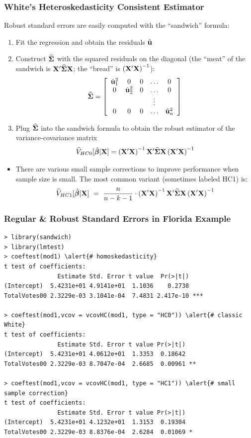 \documentclass[xcolor=svgnames,9pt,english,aspectratio=169,t]{beamer}
\begin{document}
\begin{frame}[fragile]
\frametitle{White's Heteroskedasticity Consistent Estimator}
\begin{small}
Robust standard errors are easily computed with the ``sandwich'' formula:

\begin{enumerate}
  \item Fit the regression and obtain the residuals $\hat{\mathbf{u}}$
  \item Construct $\widehat{\boldsymbol{\Sigma}}$ with the squared residuals on the diagonal (the ``meat'' of the sandwich is $\mathbf{X}'\widehat{\boldsymbol{\Sigma}}\mathbf{X}$; the ``bread'' is $\left(\mathbf{X}'\mathbf{X}\right)^{-1}$):
  $$\widehat{\boldsymbol{\Sigma}}=
 \left[ \begin{array}{ccccc} \hat{\mathbf{u}}_1^2 & 0 & 0 & \dots & 0 \\
0 & \hat{\mathbf{u}}_2^2 & 0 & \dots & 0 \\
 & & & \vdots & \\
 0 & 0 & 0 & \dots & \hat{\mathbf{u}}_n^2 \end{array} \right]
$$
\item Plug $\widehat{\boldsymbol{\Sigma}}$ into the sandwich formula to obtain the robust estimator of the variance-covariance matrix$$
\widehat{V}_{HC0}[\hat{\boldsymbol{\beta}}|\mathbf{X}] = \left(\mathbf{X}'\mathbf{X}\right)^{-1} \mathbf{X}' \widehat{\boldsymbol{\Sigma}} \mathbf{X} \left(\mathbf{X}'\mathbf{X}\right)^{-1}
$$
\end{enumerate}
\end{small}
\pause
\footnotesize{
\begin{itemize}
\item There are various \alert{small sample corrections} to improve performance when sample size is small. The most common variant (sometimes labeled HC1) is:
$$ \widehat{V}_{HC1}[\hat{\b}|\X] \ = \ \frac{n}{n-k-1} \cdot \XXinv \X' \widehat{\bs{\Sigma}} \X \XXinv $$
\end{itemize}
}
\end{frame}



\begin{frame}[fragile]
\frametitle{Regular \& Robust Standard Errors in Florida Example}

\begin{Verbatim}[fontsize=\scriptsize, frame=single, label=R Code, commandchars=\\\{\}]
> library(sandwich)
> library(lmtest)
> coeftest(mod1) \alert{# homoskedasticity}
t test of coefficients:
               Estimate Std. Error t value  Pr(>|t|)
(Intercept)  5.4231e+01 4.9141e+01  1.1036    0.2738
TotalVotes00 2.3229e-03 3.1041e-04  7.4831 2.417e-10 ***

> coeftest(mod1,vcov = vcovHC(mod1, type = "HC0")) \alert{# classic White}
t test of coefficients:
               Estimate Std. Error t value Pr(>|t|)
(Intercept)  5.4231e+01 4.0612e+01  1.3353  0.18642
TotalVotes00 2.3229e-03 8.7047e-04  2.6685  0.00961 **

> coeftest(mod1,vcov = vcovHC(mod1, type = "HC1")) \alert{# small sample correction}
t test of coefficients:
               Estimate Std. Error t value Pr(>|t|)
(Intercept)  5.4231e+01 4.1232e+01  1.3153  0.19304
TotalVotes00 2.3229e-03 8.8376e-04  2.6284  0.01069 *
\end{Verbatim}
\end{frame}
\end{document}
